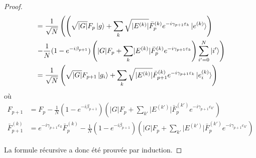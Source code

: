 \begin{proof}
\begin{equation}
\begin{aligned}
&= \frac{1}{\sqrt{ N }} \left( \left( \sqrt{ \lvert G \rvert  } F_{p} \ket{g} + \sum_{k} \sqrt{ \lvert E^{(k)} \rvert  }\bar{F}^{(k)}_{p} e^{-i \gamma_{p+1} \varepsilon_{k}} \ket{e^{(k)}} \right) \right. \\
& \left.- \frac{1}{N} (1 - e^{-i\beta_{p+1}}) \left(  \lvert G \rvert F_{p} + \sum_{k} \lvert E^{(k)} \rvert \bar{F}^{(k)}_{p} e^{-i \gamma_{p+1} \varepsilon_{k}}\right) \sum_{i'=0}^{N} \ket{i'} \right) \\
&= \frac{1}{\sqrt{ N }} \left( \sqrt{ \lvert G \rvert  } F_{p+1} \ket{g_{i}} + \sum_{k} \sqrt{ \lvert E^{(k)} \rvert  } \bar{F}^{(k)}_{p+1} e^{-i \gamma_{p+1} \varepsilon_{k}} \ket{e^{(k)}_{i}} \right) \\
\end{aligned}
\end{equation}
où
\begin{equation}
\begin{aligned}
F_{p+1} &= F_{p} - \frac{1}{N} (1-e^{-i\beta_{p+1}}) \left( \lvert G \rvert   F_{p} + \sum_{k'} \lvert E^{(k')} \rvert \bar{F}^{(k')}_{p} e^{-i\gamma_{p+1}\varepsilon_{k'}} \right) \\
\bar{F}^{(k)}_{p+1} &= e^{-i\gamma_{p+1} \varepsilon_{k}}\bar{F}_{p}^{(k)} - \frac{1}{N} (1-e^{-i\beta_{p+1}}) \left( \lvert G \rvert   F_{p} + \sum_{k'} \lvert E^{(k')} \rvert \bar{F}^{(k')}_{p} e^{-i\gamma_{p+1}\varepsilon_{k'}} \right)
\end{aligned}
\end{equation}

La formule récursive a donc été prouvée par induction.
\end{proof}

